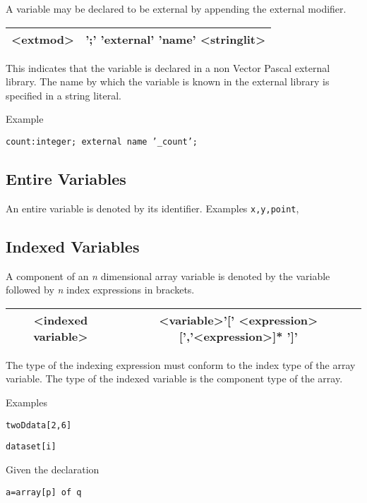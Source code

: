 {A variable may be declared to be external by appending the external modifier.

\vspace{0.3cm}
{\centering \begin{tabular}{|c|c|}
\hline 
<extmod>&
';' 'external' 'name' <stringlit>\\
\hline 
\end{tabular}\par}
\vspace{0.3cm}

This indicates that the variable is declared in a non Vector Pascal external
library. The name by which the variable is known in the external library is
specified in a string literal. 

Example

\texttt{count:integer; external name '\_count';}


\subsection{Entire Variables}\label{entire}

An entire variable is denoted by its identifier. Examples \texttt{x,y,point}, 


\subsection{Indexed Variables}

A component of an \emph{n} dimensional array variable is denoted by the variable
followed by \emph{n} index expressions in brackets.

\vspace{0.3cm}
{\centering \begin{tabular}{|c|c|}
\hline 
<indexed variable>&
<variable>'{[}' <expression>{[}','<expression>{]}{*} '{]}'\\
\hline 
\end{tabular}\par}
\vspace{0.3cm}

The type of the indexing expression must conform to the index type of the array
variable. The type of the indexed variable is the component type of the array.

Examples

\texttt{twoDdata{[}2,6{]}}

\texttt{dataset{[}i{]}}

Given the declaration 

\texttt{a=array{[}p{]} of q}

}
